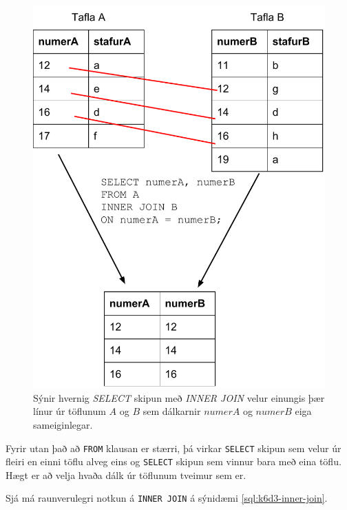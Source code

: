 \begin{figure}
\caption[INNER JOIN]{Sýnir hvernig \emph{SELECT} skipun með \emph{INNER JOIN} velur einungis þær línur úr töflunum $A$ og $B$ sem dálkarnir $numerA$ og $numerB$ eiga sameiginlegar.}
\label{mynd:inner-join}
\centering
\includegraphics[width=\linewidth]{myndir/inner-join}
\end{figure}

Fyrir utan það að \verb|FROM| klausan er stærri, þá virkar \verb|SELECT| skipun sem velur úr fleiri en einni töflu alveg eins og \verb|SELECT| skipun sem vinnur bara með eina töflu. Hægt er að velja hvaða dálk úr töflunum tveimur sem er.

Sjá má raunverulegri notkun á \verb|INNER JOIN| á sýnidæmi \ref{sql:k6d3-inner-join}.

\begin{example}
\caption[INNER JOIN]{\emph{SELECT} skipun sem velur úr töflunum \emph{Fog} og \emph{Afangar}. Niðurstöðurnar má sjá á mynd \ref{mynd:nidurstada-join}.}
\label{sql:k6d3-inner-join}
\centering
{}
\end{example}

